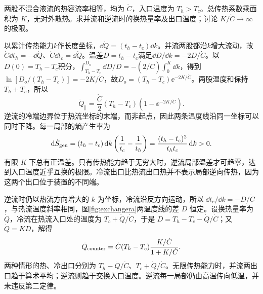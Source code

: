 \begin{example}[等热容流率的并流和逆流换热]\label{ex:heatexchanger}
两股不混合液流的热容流率相等，均为 $\dot C$，入口温度为 $T_h>T_c$。总传热系数乘面积为 $K$，无对外散热。求并流和逆流时的换热量率及出口温度；讨论 $K/\dot C\to\infty$ 的极限。
\end{example}
\begin{solution}
以累计传热能力$k$作长度坐标，$\dd\dot Q=(t_h-t_c)\dd k$。并流两股都沿$k$增大流动，故$\dot C\dd t_h=-\dd\dot Q$、$\dot C\dd t_c=\dd\dot Q$。温差$D=t_h-t_c$满足$\dd D/\dd k=-2D/\dot C$。以$D(0)=T_h-T_c$积分，$\int_{T_h-T_c}^{D_o}\dd D/D=-(2/\dot C)\int_0^K\dd k$，得到$\ln[D_o/(T_h-T_c)]=-2K/\dot C$，故$D_o=(T_h-T_c)\ee^{-2K/\dot C}$。两股温度和保持$T_h+T_c$，所以
\[
 \dot Q_{\parallel}=\frac{\dot C}{2}(T_h-T_c)(1-\ee^{-2K/\dot C}).
\]
逆流的冷端边界位于热流坐标的末端，而非起点，因此两条温度线沿同一坐标可以同时下降。每一局部的熵产生率为
\[
 \mathop{}\!\mathrm d\dot S_{\rm gen}=
 (t_h-t_c)\mathop{}\!\mathrm d k\left(\frac1{t_c}-\frac1{t_h}\right)
 =\frac{(t_h-t_c)^2}{t_ht_c}\mathop{}\!\mathrm d k>0.
\]
有限 $K$ 下总有正温差。只有传热能力趋于无穷大时，逆流局部温差才可趋零，达到入口温度近乎互换的极限。冷流出口比热流出口热并不表示局部逆向传热，因为这两个出口位于装置的不同端。

逆流时仍以热流方向增大的 $k$ 为坐标，冷流沿反方向运动，所以 $\dd t_c/\dd k=-D/\dot C$，与热流温度斜率相同，图\ref{fig:exchangera}两温度线的差 $D$ 恒定。设换热量率为 $\dot Q$，冷流在热流入口处的温度为 $T_c+\dot Q/\dot C$，于是 $D=T_h-T_c-\dot Q/\dot C$；又 $\dot Q=KD$，解得
\[
 \dot Q_{\rm counter}=\dot C(T_h-T_c)\frac{K/\dot C}{1+K/\dot C}.
\]
两种情形的热、冷出口分别为 $T_h-\dot Q/\dot C$、$T_c+\dot Q/\dot C$。无限传热能力时，并流两出口趋于算术平均；逆流则趋于交换入口温度。逆流每一局部仍由高温传向低温，并未违反第二定律。
\end{solution}

